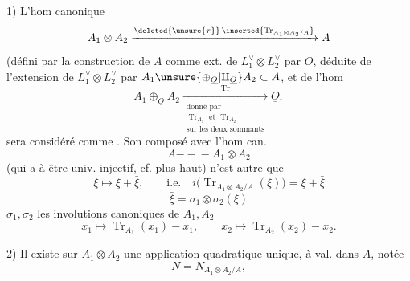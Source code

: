 1)  L'hom canonique
\[
 A_1\otimes A_2\xrightarrow{\deleted{\unsure{\tau}}\,\inserted{\operatorname{Tr}_{A_1\otimes A_2/A}}}A
\]
(défini par la construction de $A$ comme ext. de $L_1^\vee\otimes L_2^\vee$ par $\underline O$, déduite de l'extension  de $L_1^\vee\otimes L_2^\vee$ par $A_1\unsure{\oplus_{\underline O}|\amalg_{\underline O}}A_2\subset A$,  et de l'hom
\[
 A_1\oplus_{\underline O}A_2\xrightarrow[\substack{\text{donné par}\\ \operatorname{Tr}_{A_1}\text{ et }\operatorname{Tr}_{A_2}\\\text{sur les deux sommants}}]{\operatorname{Tr}}\underline O,
\]
sera considéré comme .
Son composé avec l'hom can.
\[
 A\mathrel{-\!\!-\!\!-}A_1\otimes A_2
\]
(qui a  à être univ. injectif, cf. plus haut)  n'est autre que
\[
 \xi\longmapsto\xi+\bar\xi,\qquad\text{i.e.}\quad
 \boxed{i\bigl(\operatorname{Tr}_{A_1\otimes A_2/A}(\xi)\bigr)=\xi+\bar\xi}
\]
\[
 \bar\xi=\sigma_1\otimes\sigma_2(\xi)
\]
$\sigma_1,\sigma_2$ les involutions canoniques de $A_1,A_2$
\[
 x_1\longmapsto\operatorname{Tr}_{A_1}(x_1)-x_1,\qquad
 x_2\longmapsto\operatorname{Tr}_{A_2}(x_2)-x_2.
\]

2) Il existe sur $A_1\otimes A_2$ une application quadratique unique, à val. dans $A$, notée
\[
 N=N_{A_1\otimes A_2/A},
\]

